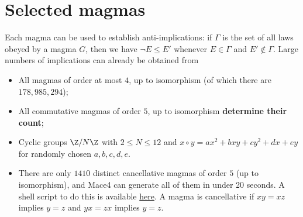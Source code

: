 \chapter{Selected magmas}

Each magma can be used to establish anti-implications: if $\Gamma$ is the set of all laws obeyed by a magma $G$, then we have $\neg E \leq E'$ whenever $E \in \Gamma$ and $E' \not \in \Gamma$.  Large numbers of implications can already be obtained from

\begin{itemize}
  \item All magmas of order at most $4$, up to isomorphism (of which there are $178,985,294$);
  \item All commutative magmas of order $5$, up to isomorphism {\bf determine their count};
  \item Cyclic groups $\Z/N\Z$ with $2 \leq N \leq 12$ and $x \circ y = ax^2+bxy+cy^2+dx+ey$ for randomly chosen $a,b,c,d,e$.
  \item There are only $1410$ distinct cancellative magmas of order $5$ (up to isomorphism), and Mace4 can generate all of them in under 20 seconds. A shell script to do this is available \href{https://github.com/zaklogician/equational_theories/tree/cancellative_magmas/scripts/cancellative_magmas}{here}. A magma is cancellative if $xy=xz$ implies $y=z$ and $yx=zx$ implies $y=z$.
\end{itemize}


